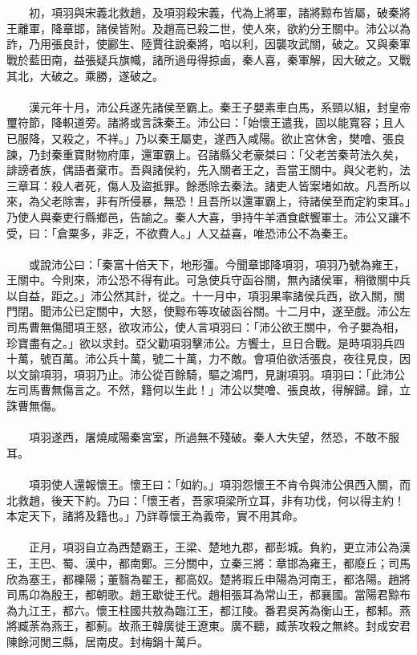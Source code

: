 \\\\
　　初，項羽與宋義北救趙，及項羽殺宋義，代為上將軍，諸將黥布皆屬，破秦將王離軍，降章邯，諸侯皆附。及趙高已殺二世，使人來，欲約分王關中。沛公以為詐，乃用張良計，使酈生、陸賈往說秦將，啗以利，因襲攻武關，破之。又與秦軍戰於藍田南，益張疑兵旗幟，諸所過毋得掠鹵，秦人喜，秦軍解，因大破之。又戰其北，大破之。乘勝，遂破之。
\\\\
　　漢元年十月，沛公兵遂先諸侯至霸上。秦王子嬰素車白馬，系頸以組，封皇帝璽符節，降軹道旁。諸將或言誅秦王。沛公曰：「始懷王遣我，固以能寬容；且人已服降，又殺之，不祥。」乃以秦王屬吏，遂西入咸陽。欲止宮休舍，樊噲、張良諫，乃封秦重寶財物府庫，還軍霸上。召諸縣父老豪桀曰：「父老苦秦苛法久矣，誹謗者族，偶語者棄市。吾與諸侯約，先入關者王之，吾當王關中。與父老約，法三章耳：殺人者死，傷人及盜抵罪。餘悉除去秦法。諸吏人皆案堵如故。凡吾所以來，為父老除害，非有所侵暴，無恐！且吾所以還軍霸上，待諸侯至而定約束耳。」乃使人與秦吏行縣鄉邑，告諭之。秦人大喜，爭持牛羊酒食獻饗軍士。沛公又讓不受，曰：「倉粟多，非乏，不欲費人。」人又益喜，唯恐沛公不為秦王。
\\\\
　　或說沛公曰：「秦富十倍天下，地形彊。今聞章邯降項羽，項羽乃號為雍王，王關中。今則來，沛公恐不得有此。可急使兵守函谷關，無內諸侯軍，稍徵關中兵以自益，距之。」沛公然其計，從之。十一月中，項羽果率諸侯兵西，欲入關，關門閉。聞沛公已定關中，大怒，使黥布等攻破函谷關。十二月中，遂至戲。沛公左司馬曹無傷聞項王怒，欲攻沛公，使人言項羽曰：「沛公欲王關中，令子嬰為相，珍寶盡有之。」欲以求封。亞父勸項羽擊沛公。方饗士，旦日合戰。是時項羽兵四十萬，號百萬。沛公兵十萬，號二十萬，力不敵。會項伯欲活張良，夜往見良，因以文諭項羽，項羽乃止。沛公從百餘騎，驅之鴻門，見謝項羽。項羽曰：「此沛公左司馬曹無傷言之。不然，籍何以生此！」沛公以樊噲、張良故，得解歸。歸，立誅曹無傷。
\\\\
　　項羽遂西，屠燒咸陽秦宮室，所過無不殘破。秦人大失望，然恐，不敢不服耳。
\\\\
　　項羽使人還報懷王。懷王曰：「如約。」項羽怨懷王不肯令與沛公俱西入關，而北救趙，後天下約。乃曰：「懷王者，吾家項梁所立耳，非有功伐，何以得主約！本定天下，諸將及籍也。」乃詳尊懷王為義帝，實不用其命。
\\\\
　　正月，項羽自立為西楚霸王，王梁、楚地九郡，都彭城。負約，更立沛公為漢王，王巴、蜀、漢中，都南鄭。三分關中，立秦三將：章邯為雍王，都廢丘；司馬欣為塞王，都櫟陽；董翳為翟王，都高奴。楚將瑕丘申陽為河南王，都洛陽。趙將司馬卬為殷王，都朝歌。趙王歇徙王代。趙相張耳為常山王，都襄國。當陽君黥布為九江王，都六。懷王柱國共敖為臨江王，都江陵。番君吳芮為衡山王，都邾。燕將臧荼為燕王，都薊。故燕王韓廣徙王遼東。廣不聽，臧荼攻殺之無終。封成安君陳餘河閒三縣，居南皮。封梅鋗十萬戶。
